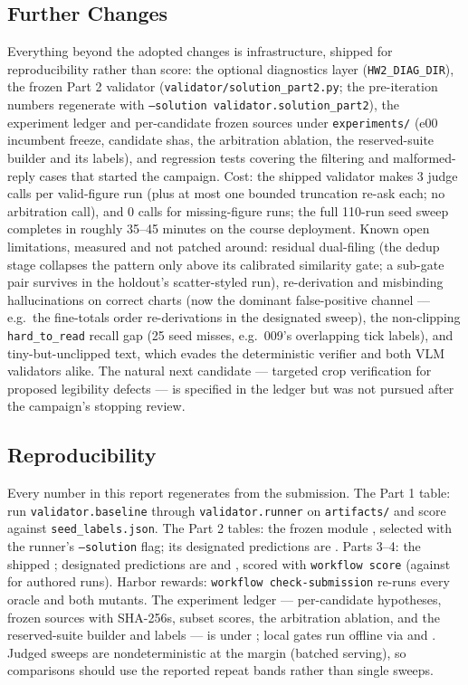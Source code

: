 \documentclass[11pt]{article}
\begin{document}
\subsection{Further Changes}
Everything beyond the adopted changes is infrastructure, shipped for
reproducibility rather than score: the optional diagnostics layer
(\texttt{HW2\_DIAG\_DIR}), the frozen Part 2 validator
(\texttt{validator/solution\_part2.py}; the pre-iteration numbers
regenerate with \texttt{--solution validator.solution\_part2}), the
experiment ledger and per-candidate frozen sources under
\texttt{experiments/} (e00 incumbent freeze, candidate shas, the
arbitration ablation, the reserved-suite builder and its labels), and
regression tests covering the filtering and malformed-reply cases that
started the campaign. Cost: the shipped validator makes 3 judge calls
per valid-figure run (plus at most one bounded truncation re-ask each;
no arbitration call), and 0 calls for missing-figure runs; the full
110-run seed sweep completes in roughly 35--45 minutes on the course
deployment. Known open limitations, measured and not patched around:
residual dual-filing (the dedup stage collapses the pattern only above
its calibrated similarity gate; a sub-gate pair survives in the
holdout's scatter-styled run), re-derivation and misbinding
hallucinations on correct charts (now the dominant false-positive
channel --- e.g.\ the fine-totals order re-derivations in the
designated sweep), the non-clipping \texttt{hard\_to\_read} recall
gap (25 seed misses, e.g.\ 009's overlapping tick labels), and
tiny-but-unclipped text, which evades the deterministic verifier and
both VLM validators alike. The natural next candidate --- targeted crop
verification for proposed legibility defects --- is specified in the
ledger but was not pursued after the campaign's stopping review.

\subsection{Reproducibility}
\sloppy
Every number in this report regenerates from the submission. The Part 1
table: run \texttt{validator.baseline} through \texttt{validator.runner}
on \texttt{artifacts/} and score against \texttt{seed\_labels.json}. The
Part 2 tables: the frozen module ,
selected with the runner's \texttt{--solution} flag; its designated
predictions are . Parts 3--4: the
shipped ; designated predictions are
 and
, scored with
\texttt{workflow score} (against  for authored
runs). Harbor rewards: \texttt{workflow check-submission} re-runs every
oracle and both mutants. The experiment ledger --- per-candidate
hypotheses, frozen sources with SHA-256s, subset scores, the arbitration
ablation, and the reserved-suite builder and labels --- is under
; local gates run offline via
 and
. Judged sweeps are
nondeterministic at the margin (batched serving), so comparisons should
use the reported repeat bands rather than single sweeps.
\par\fussy
\end{document}
